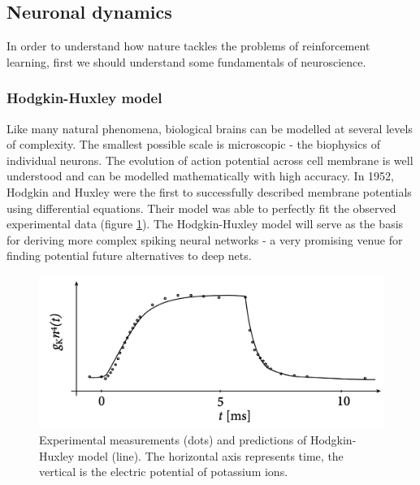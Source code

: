 \documentclass[12pt]{article}
\begin{document}
\subsection{Neuronal dynamics}

In order to understand how nature tackles the problems of reinforcement learning, first we should understand some fundamentals of neuroscience. 

\subsubsection{Hodgkin-Huxley model}

Like many natural phenomena, biological brains can be modelled at several levels of complexity. The smallest possible scale is microscopic - the biophysics of individual neurons. The evolution of action potential across cell membrane is well understood and can be modelled mathematically with high accuracy. In 1952, Hodgkin and Huxley \cite{hodgkin} were the first to successfully described membrane potentials using differential equations. Their model was able to perfectly fit the observed experimental data (figure \ref{fig:hodgkin_huxley_experiments}). The Hodgkin-Huxley model will serve as the basis for deriving more complex spiking neural networks - a very promising venue for finding potential future alternatives to deep nets.
\begin{figure}[!htbp]
	\centering
	\includegraphics[width=13cm]{hodgkin_huxley_experiments}
	\caption{Experimental measurements (dots) and predictions of Hodgkin-Huxley model  (line). The horizontal axis represents time, the vertical is the electric potential of potassium ions.}
	\label{fig:hodgkin_huxley_experiments}
\end{figure} 
\end{document}
